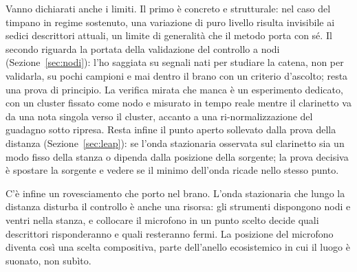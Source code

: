 \documentclass{article}
\begin{document}
Vanno dichiarati anche i limiti. Il primo è concreto e strutturale: nel caso del timpano in regime sostenuto, una variazione di puro livello risulta invisibile ai sedici descrittori attuali, un limite di generalità che il metodo porta con sé. Il secondo riguarda la portata della validazione del controllo a nodi (Sezione~\ref{sec:nodi}): l'ho saggiata su segnali nati per studiare la catena, non per validarla, su pochi campioni e mai dentro il brano con un criterio d'ascolto; resta una prova di principio. La verifica mirata che manca è un esperimento dedicato, con un cluster fissato come nodo e misurato in tempo reale mentre il clarinetto va da una nota singola verso il cluster, accanto a una ri-normalizzazione del guadagno sotto ripresa. Resta infine il punto aperto sollevato dalla prova della distanza (Sezione~\ref{sec:leap}): se l'onda stazionaria osservata sul clarinetto sia un modo fisso della stanza o dipenda dalla posizione della sorgente; la prova decisiva è spostare la sorgente e vedere se il minimo dell'onda ricade nello stesso punto.

C'è infine un rovesciamento che porto nel brano. L'onda stazionaria che lungo la distanza disturba il controllo è anche una risorsa: gli strumenti dispongono nodi e ventri nella stanza, e collocare il microfono in un punto scelto decide quali descrittori risponderanno e quali resteranno fermi. La posizione del microfono diventa così una scelta compositiva, parte dell'anello ecosistemico in cui il luogo è suonato, non subìto.

\end{document}
